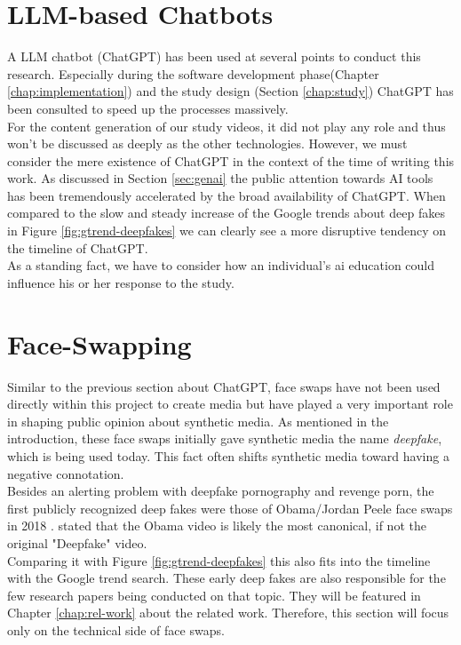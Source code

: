 \documentclass[
  a4paper,  %
  twoside,  %
  bibliography=totoc,
  headsepline,
  cleardoublepage=empty,
  parskip=half,
  draft=false
]{scrbook}
\begin{document}
\section{LLM-based Chatbots}
A LLM chatbot (ChatGPT) has been used at several points to conduct this research. Especially during the software development phase(Chapter \ref{chap:implementation}) and the study design (Section \ref{chap:study}) ChatGPT has been consulted to speed up the processes massively. \\ 
For the content generation of our study videos, it did not play any role and thus won't be discussed as deeply as the other technologies. However, we must consider the mere existence of ChatGPT in the context of the time of writing this work. As discussed in Section \ref{sec:genai} the public attention towards AI tools has been tremendously accelerated by the broad availability of ChatGPT. When compared to the slow and steady increase of the Google trends about deep fakes in Figure \ref{fig:gtrend-deepfakes} we can clearly see a more disruptive tendency on the timeline of ChatGPT. \\
As a standing fact, we have to consider how an individual's \gls{ai} education could influence his or her response to the study.

\section{Face-Swapping}
\label{sec:face-swapping}
Similar to the previous section about ChatGPT, face swaps have not been used directly within this project to create media but have played a very important role in shaping public opinion about synthetic media. As mentioned in the introduction, these face swaps initially gave synthetic media the name \textit{deepfake}, which is being used today. This fact often shifts synthetic media toward having a negative connotation. \\
Besides an alerting problem with deepfake pornography and revenge porn, the first publicly recognized deep fakes were those of Obama/Jordan Peele face swaps in 2018 \cite{vincentWatchJordanPeele2018}. \citet{hancockSocialImpactDeepfakes2021} stated that the Obama video is likely the most canonical, if not the original "Deepfake" video. \\
Comparing it with Figure \ref{fig:gtrend-deepfakes} this also fits into the timeline with the Google trend search. These early deep fakes are also responsible for the few research papers being conducted on that topic. They will be featured in Chapter \ref{chap:rel-work} about the related work. Therefore, this section will focus only on the technical side of face swaps.
\end{document}
